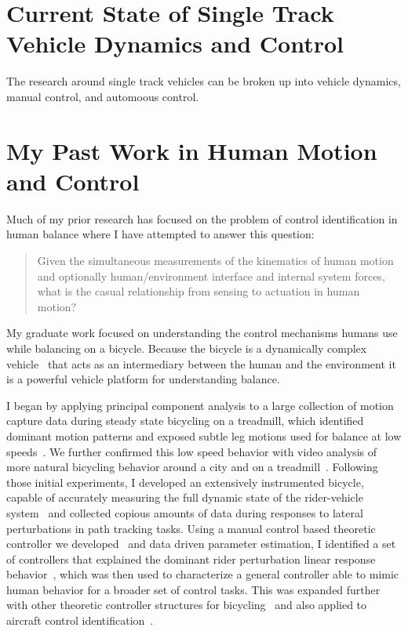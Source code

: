 \documentclass{article}
\begin{document}
\section*{Current State of Single Track Vehicle Dynamics and Control}
%
The research around single track vehicles can be broken up into vehicle
dynamics, manual control, and automoous control.

\section*{My Past Work in Human Motion and Control}
%
Much of my prior research has focused on the problem of control identification
in human balance where I have attempted to answer this question:

\begin{quote}
  Given the simultaneous measurements of the kinematics of human motion and
  optionally human/environment interface and internal system forces, what is
  the casual relationship from sensing to actuation in human motion?
\end{quote}

My graduate work focused on understanding the control mechanisms humans use
while balancing on a bicycle. Because the bicycle is a dynamically complex
vehicle~\cite{Astrom2005,Meijaard2007,Moore2007,Moore2008} that acts as an
intermediary between the human and the environment it is a powerful vehicle
platform for understanding balance.

I began by applying principal component analysis to a large collection of
motion capture data during steady state bicycling on a treadmill, which
identified dominant motion patterns and exposed subtle leg motions used for
balance at low speeds~\cite{Moore2009a,Moore2011c}. We further confirmed this
low speed behavior with video analysis of more natural bicycling behavior
around a city and on a treadmill~\cite{Kooijman2009}. Following those initial
experiments, I developed an extensively instrumented bicycle, capable of
accurately measuring the full dynamic state of the rider-vehicle
system~\cite{Moore2012,Moore2013} and collected copious amounts of data during
responses to lateral perturbations in path tracking tasks. Using a manual
control based theoretic controller we developed~\cite{Hess2012} and data driven
parameter estimation, I identified a set of controllers that explained the
dominant rider perturbation linear response behavior~\cite{Moore2012}, which
was then used to characterize a general controller able to mimic human behavior
for a broader set of control tasks. This was expanded further with other
theoretic controller structures for
bicycling~\cite{Schwab2012a,Schwab2012,Schwab2013} and also applied to aircraft
control identification~\cite{Hess2013}.
\end{document}
